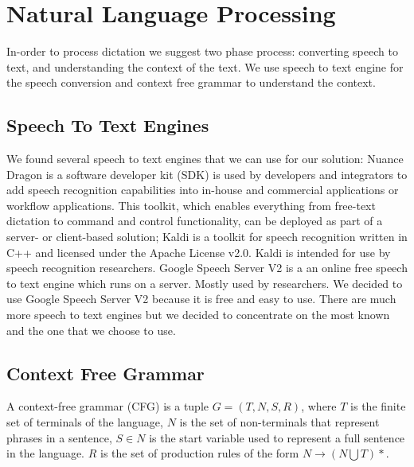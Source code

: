 \section{Natural Language Processing}
In-order to process dictation we suggest two phase process: converting speech to text, and understanding the context of the text. We use speech to text engine for the speech conversion and context free grammar to understand the  context.
\subsection{Speech To Text Engines}
We found several speech to text engines that we can use for our solution: Nuance Dragon \cite{Nuance14} is a software developer kit (SDK) is used by developers and integrators to add speech recognition capabilities into in-house and commercial applications or workflow applications. This toolkit, which enables everything from free-text dictation to command and control functionality, can be deployed as part of a server- or client-based solution; Kaldi \cite{Povey_ASRU2011} is a toolkit for speech recognition written in C++ and licensed under the Apache License v2.0. Kaldi is intended for use by speech recognition researchers. Google Speech Server V2 \cite{google15} is a an online free speech to text engine which runs on a server. Mostly used by researchers. We decided to use Google Speech Server V2 because it is free and easy to use. There are much more speech to text engines but we decided to concentrate on the most known and the one that we choose to use.
\subsection{Context Free Grammar}
A context-free grammar (CFG) is a tuple $ G=(T,N,S,R) $, where $ T $ is the finite set of  terminals of the language, $ N $ is the set of non-terminals that represent phrases in a sentence, $ S \in N $ is the start variable used to represent a full sentence in the language. $ R $ is the set of production rules of the form $ N \rightarrow (N \bigcup T)* $.
